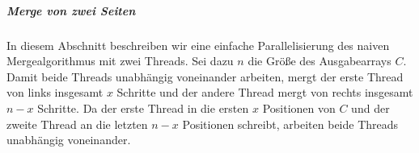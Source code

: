 \subparagraph*{Merge von zwei Seiten}
\label{dc3:erweiterung:parallel:mergezweiseiten}

In diesem Abschnitt beschreiben wir eine einfache Parallelisierung des naiven Mergealgorithmus mit zwei Threads. Sei dazu $n$ die Größe des Ausgabearrays $C$. Damit beide Threads unabhängig voneinander arbeiten, mergt der erste Thread von links insgesamt $x$ Schritte und der andere Thread mergt von rechts insgesamt $n-x$ Schritte. Da der erste Thread in die ersten $x$ Positionen von $C$ und der zweite Thread an die letzten $n-x$ Positionen schreibt, arbeiten beide Threads unabhängig voneinander.
